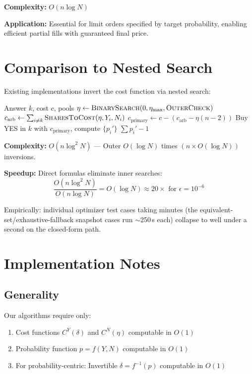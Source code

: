 \documentclass[11pt]{article}
\begin{document}
\textbf{Complexity:} $O(n \log N)$

\textbf{Application:} Essential for limit orders specified by target probability, enabling efficient partial fills with guaranteed final price.

\section{Comparison to Nested Search}

Existing implementations invert the cost function via nested search:

\begin{algorithm}[H]
\caption{Nested Search Approach (Existing)}
\begin{algorithmic}[1]
\Require Answer $k$, cost $c$, pools
\State $\eta \gets \textsc{BinarySearch}(0, \eta_{\max}, \textsc{OuterCheck})$ 
    \State $c_{\text{arb}} \gets \sum_{i \neq k} \textsc{SharesToCost}(\eta, Y_i, N_i)$ 
    \State $c_{\text{primary}} \gets c - (c_{\text{arb}} - \eta(n-2))$
    \State Buy YES in $k$ with $c_{\text{primary}}$, compute $\{p_i'\}$
    \State \Return $\sum p_i' - 1$
\EndFunction
\end{algorithmic}
\end{algorithm}

\textbf{Complexity:} $O(n \log^2 N)$ — Outer $O(\log N)$ times $(n \times O(\log N))$ inversions.

\textbf{Speedup:} Direct formulas eliminate inner searches:
\begin{equation}
\frac{O(n \log^2 N)}{O(n \log N)} = O(\log N) \approx 20\times \text{ for } \epsilon = 10^{-6}
\end{equation}

Empirically: individual optimizer test cases taking minutes (the
equivalent-set/exhaustive-fallback snapshot cases run $\sim$250\,s each) collapse to
well under a second on the closed-form path.

\section{Implementation Notes}

\subsection{Generality}

Our algorithms require only:
\begin{enumerate}
\item Cost functions $C^Y(\delta)$ and $C^N(\eta)$ computable in $O(1)$
\item Probability function $p = f(Y, N)$ computable in $O(1)$
\item For probability-centric: Invertible $\delta = f^{-1}(p)$ computable in $O(1)$
\end{enumerate}
\end{document}
